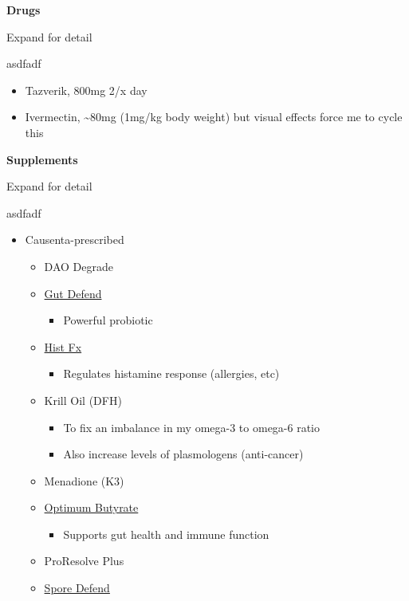 \documentclass[
  letterpaper,
  DIV=11,
  numbers=noendperiod]{scrreprt}
\providecommand{\tightlist}{%
  \setlength{\itemsep}{0pt}\setlength{\parskip}{0pt}}\usepackage{longtable,booktabs,array}
\begin{document}
\textbf{Drugs}

Expand for detail

asdfadf

\begin{itemize}
\item
  Tazverik, 800mg 2/x day
\item
  Ivermectin, \textasciitilde80mg (1mg/kg body weight) but visual
  effects force me to cycle this
\end{itemize}

\textbf{Supplements}

Expand for detail

asdfadf

\begin{itemize}
\item
  Causenta-prescribed

  \begin{itemize}
  \item
    DAO Degrade
  \item
    \href{https://causenta.com/store/Gut-Defend-Probiotic-p109023222}{Gut
    Defend}

    \begin{itemize}
    \tightlist
    \item
      Powerful probiotic
    \end{itemize}
  \item
    \href{https://causenta.com/store/HistFx-Vitamin-C-Quercetin-and-Stinging-Nettles-Leaf-p109023244}{Hist
    Fx}

    \begin{itemize}
    \tightlist
    \item
      Regulates histamine response (allergies, etc)
    \end{itemize}
  \item
    Krill Oil (DFH)

    \begin{itemize}
    \item
      To fix an imbalance in my omega-3 to omega-6 ratio
    \item
      Also increase levels of plasmologens (anti-cancer)
    \end{itemize}
  \item
    Menadione (K3)
  \item
    \href{https://aimstore.net/products/optimumbutyrate}{Optimum
    Butyrate}

    \begin{itemize}
    \tightlist
    \item
      Supports gut health and immune function
    \end{itemize}
  \item
    ProResolve Plus
  \item
    \href{https://causenta.com/store/Spore-Defend-Probiotic-p319826021}{Spore
    Defend}


\end{itemize}
\end{itemize}
\end{document}
